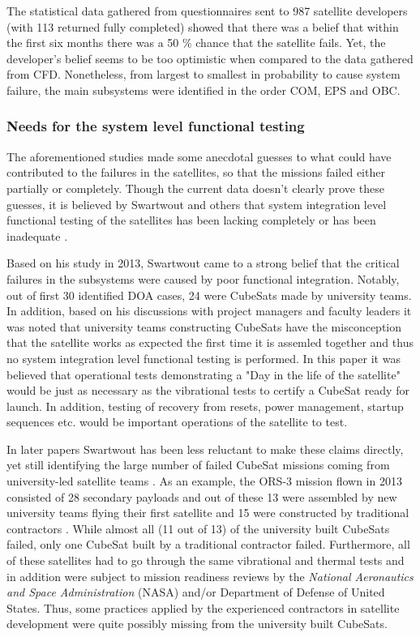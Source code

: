 \documentclass[english,12pt,a4paper,pdftex,elec,utf8]{aaltothesis}
\begin{document}
The statistical data gathered from questionnaires sent to 987 satellite developers (with 113 returned fully completed) showed that there was a belief that within the first six months there was a 50 \% chance that the satellite fails. Yet, the developer's belief seems to be too optimistic when compared to the data gathered from CFD. Nonetheless, from largest to smallest in probability to cause system failure, the main subsystems were identified in the order COM, EPS and OBC. \cite{Langer}\par
\subsubsection{Needs for the system level functional testing}
The aforementioned studies made some anecdotal guesses to what could have contributed to the failures in the satellites, so that the missions failed either partially or completely. Though the current data doesn't clearly prove these guesses, it is believed by Swartwout and others that system integration level functional testing of the satellites has been lacking completely or has been inadequate \cite{Swart2016, Langer, Swart1, Swart2015}. \par
Based on his study in 2013, Swartwout came to a strong belief that the critical failures in the subsystems were caused by poor functional integration. Notably, out of first 30 identified DOA cases, 24 were CubeSats made by university teams. In addition, based on his discussions with project managers and faculty leaders it was noted that university teams constructing CubeSats have the misconception that the satellite works as expected the first time it is assemled together and thus no system integration level functional testing is performed. In this paper it was believed that operational tests demonstrating a "Day in the life of the satellite" would be just as necessary as the vibrational tests to certify a CubeSat ready for launch. In addition, testing of recovery from resets, power management, startup sequences etc. would be important operations of the satellite to test. \cite{Swart1} \par
In later papers Swartwout has been less reluctant to make these claims directly, yet still identifying the large number of failed CubeSat missions coming from university-led satellite teams \cite{Swart2016, Swart2015}. As an example, the ORS-3 mission flown in 2013 consisted of 28 secondary payloads and out of these 13 were assembled by new university teams flying their first satellite and 15 were constructed by traditional contractors \cite{Swart2016}. While almost all (11 out of 13) of the university built CubeSats failed, only one CubeSat built by a traditional contractor failed. Furthermore, all of these satellites had to go through the same vibrational and thermal tests and in addition were subject to mission readiness reviews by the \textit{National Aeronautics and Space Administration} (NASA) and/or Department of Defense of United States. Thus, some practices applied by the experienced contractors in satellite development were quite possibly missing from the university built CubeSats.\par
\end{document}
